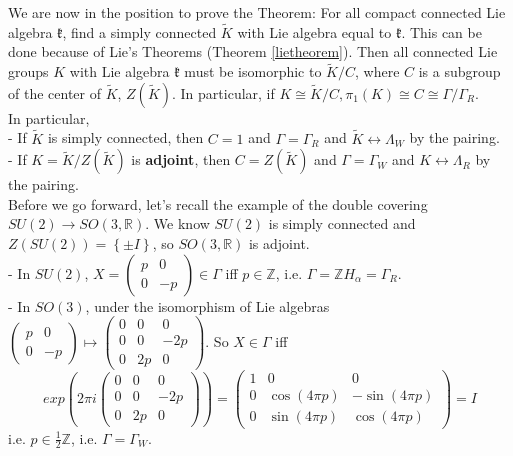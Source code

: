 \documentclass[11pt]{article}
\newcommand{\bb}[1]{\mathbb{#1}}
\newcommand{\mf}[1]{\mathfrak{#1}}
\begin{document}
We are now in the position to prove the Theorem: For all compact connected Lie algebra $\mf{k}$, find a simply connected $\tilde{K}$ with Lie algebra equal to $\mf{k}$. This can be done because of Lie's Theorems (Theorem \ref{lietheorem}). Then all connected Lie groups $K$ with Lie algebra $\mf{k}$ must be isomorphic to $\tilde{K}/C$, where $C$ is a subgroup of the center of $\tilde{K}$, $Z(\tilde{K})$. In particular, if $K \cong \tilde{K}/C, \pi_1(K) \cong C \cong \Gamma/\Gamma_R$.\\
In particular,\\
- If $\tilde{K}$ is simply connected, then $C = 1$ and $\Gamma = \Gamma_R$ and $\tilde{K} \leftrightarrow \Lambda_W$ by the pairing.\\
- If $K = \tilde{K}/Z(\tilde{K})$ is \textbf{adjoint}, then $C = Z(\tilde{K})$ and $\Gamma = \Gamma_W$ and $K \leftrightarrow \Lambda_R$ by the pairing.\\

Before we go forward, let's recall the example of the double covering $SU(2) \to SO(3,\bb{R})$. We know $SU(2)$ is simply connected and $Z(SU(2)) = \left\{\pm I\right\}$, so $SO(3,\bb{R})$ is adjoint.\\

\noindent - In $SU(2)$, $X = \left( \begin{array}{cc}
p & 0  \\
0 & -p  \end{array} \right) \in \Gamma$ iff $p \in \bb{Z}$, i.e. $\Gamma = \bb{Z}{H_{\alpha}} = \Gamma_R$.\\

\noindent - In $SO(3)$, under the isomorphism of Lie algebras $\left( \begin{array}{cc}
p & 0  \\
0 & -p  \end{array} \right) \mapsto \left( \begin{array}{ccc}
0 & 0 & 0 \\
0 & 0 & -2p \\
0 & 2p & 0  \end{array} \right)$. So $X \in \Gamma$ iff
$$exp(2\pi i \left( \begin{array}{ccc}
0 & 0 & 0 \\
0 & 0 & -2p \\
0 & 2p & 0  \end{array} \right)) = \left( \begin{array}{ccc}
1 & 0 & 0 \\
0 & \cos(4\pi p) & -\sin(4\pi p) \\
0 & \sin(4 \pi p) & \cos(4\pi p)  \end{array} \right) = I$$
i.e. $p \in \frac{1}{2}\bb{Z}$, i.e. $\Gamma = \Gamma_W$.\\
\end{document}
